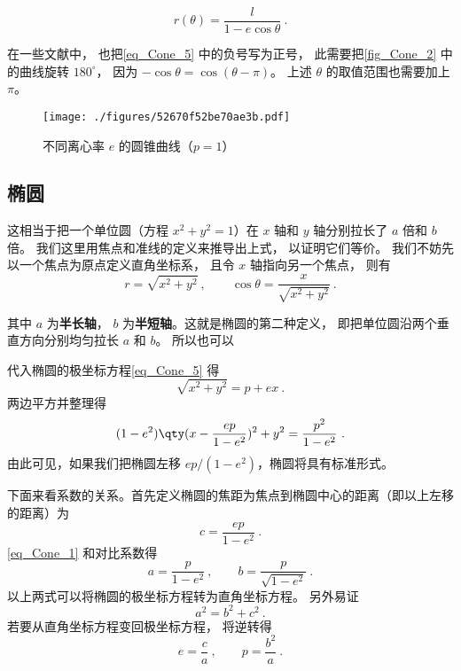 \begin{equation}\label{eq_Cone_5}
r(\theta)  = \frac{l}{1 - e\cos \theta }~.
\end{equation}

在一些文献中， 也把\autoref{eq_Cone_5} 中的负号写为正号， 此需要把\autoref{fig_Cone_2} 中的曲线旋转 $180^\circ$， 因为 $-\cos\theta = \cos(\theta - \pi)$。 上述 $\theta$ 的取值范围也需要加上 $\pi$。


\begin{figure}[ht]
\centering
\texttt{[image: ./figures/52670f52be70ae3b.pdf]}
\caption{不同离心率 $e$ 的圆锥曲线（$p = 1$）} \label{fig_Cone_2}
\end{figure}



\subsection{椭圆}

这相当于把一个单位圆（方程 $x^2 + y^2 = 1$）在 $x$ 轴和 $y$ 轴分别拉长了 $a$ 倍和 $b$ 倍。 我们这里用焦点和准线的定义来推导出上式， 以证明它们等价。 我们不妨先以一个焦点为原点定义直角坐标系， 且令 $x$ 轴指向另一个焦点， 则有
\begin{equation}
r = \sqrt{x^2 + y^2}~, \qquad \cos\theta = \frac{x}{\sqrt{x^2 + y^2}}~.
\end{equation}

其中 $a$ 为\textbf{半长轴}， $b$ 为\textbf{半短轴}。这就是椭圆的第二种定义， 即把单位圆沿两个垂直方向分别均匀拉长 $a$ 和 $b$。 所以也可以

代入椭圆的极坐标方程\autoref{eq_Cone_5}  得
\begin{equation}
\sqrt{x^2 + y^2} = p + ex~.
\end{equation}
两边平方并整理得
\begin{equation}\label{eq_Cone_1}
(1 - e^2) \qty( x - \frac{ep}{1 - e^2} )^2 + y^2 = \frac{p^2}{1 - e^2}~.
\end{equation}
由此可见，如果我们把椭圆左移 $ep/(1 - e^2)$，椭圆将具有标准形式。 


下面来看系数的关系。首先定义椭圆的焦距为焦点到椭圆中心的距离（即以上左移的距离）为
\begin{equation}
c = \frac{ep}{1 - e^2}~.
\end{equation}
\autoref{eq_Cone_1}  和对比系数得
\begin{equation}
a = \frac{p}{1 - e^2}~, \qquad b = \frac{p}{\sqrt {1 - e^2} }~.
\end{equation}
以上两式可以将椭圆的极坐标方程转为直角坐标方程。 另外易证
\begin{equation}
a^2 = b^2 + c^2~.
\end{equation}
若要从直角坐标方程变回极坐标方程， 将逆转得
\begin{equation}
e = \frac{c}{a}~,\qquad
p = \frac{b^2}{a}~.
\end{equation}


